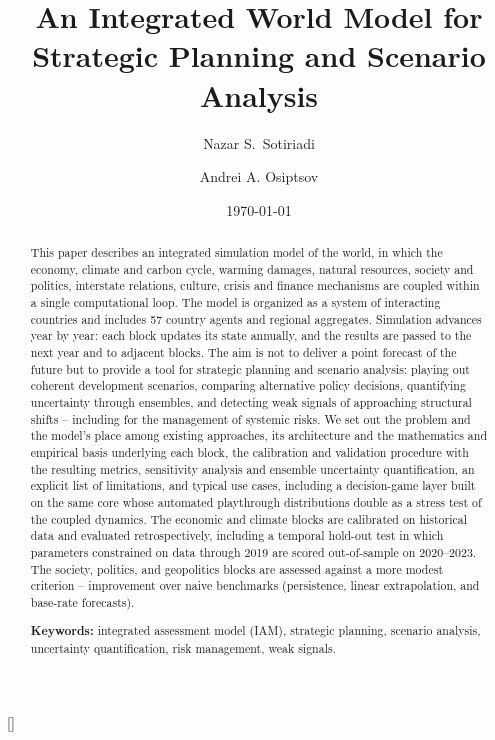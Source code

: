 \documentclass[a4paper,fleqn]{cas-sc}
\begin{document}
\let\WriteBookmarks\relax
\def\floatpagepagefraction{1}
\def\textpagefraction{.001}



\title[mode = title]{An Integrated World Model for Strategic Planning and Scenario Analysis}
\author[1]{Nazar S.~Sotiriadi}
\cormark[1]
\author[1,2]{Andrei A. Osiptsov}[]

\date{\today}

\maketitle

\begin{abstract}
\noindent
This paper describes an integrated simulation model of the world, in which the economy, climate
and carbon cycle, warming damages, natural resources, society and politics, interstate
relations, culture, crisis and finance mechanisms are coupled within a single computational
loop. The model is organized as a system of interacting countries and includes 57 country agents and regional aggregates. Simulation advances year by year: each block updates its state annually, and the results are passed to the next year and to adjacent blocks. The aim is not to deliver a point forecast of the future but to provide a tool for strategic planning and scenario analysis: playing out coherent development scenarios, comparing alternative policy decisions, quantifying uncertainty through ensembles, and detecting weak signals of approaching structural shifts -- including for the management of systemic risks. We set out the problem and the model's place among existing approaches, its architecture and the mathematics and empirical basis underlying each block, the calibration and validation procedure with the resulting metrics, sensitivity analysis and ensemble uncertainty quantification, an explicit list of limitations, and typical use cases, including a decision-game layer built on the same core whose automated playthrough distributions double as a stress test of the coupled dynamics. The economic and climate blocks are calibrated on historical data and evaluated retrospectively, including a temporal hold-out test in which parameters constrained on data through 2019 are scored out-of-sample on 2020--2023. The society, politics, and geopolitics blocks are assessed against a more modest criterion -- improvement over naive benchmarks (persistence, linear extrapolation, and base-rate forecasts).

\medskip
\noindent\textbf{Keywords:} integrated assessment model (IAM), strategic planning, scenario analysis, uncertainty quantification, risk management, weak signals.
\end{abstract}
\end{document}
